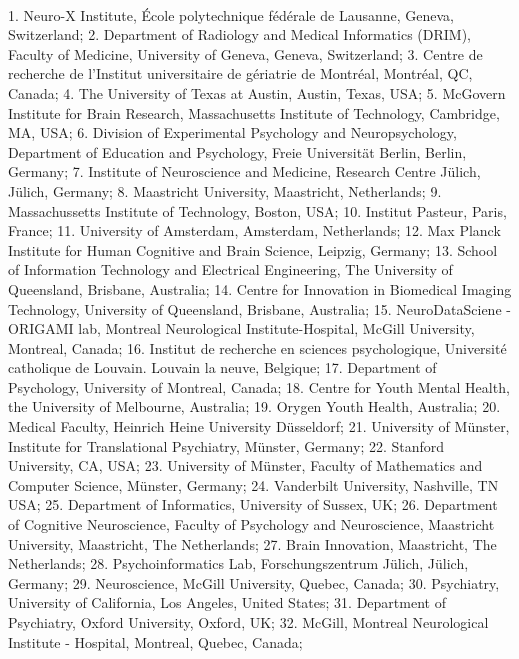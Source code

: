\documentclass[10pt,a4paper,twocolumns]{proc}
\newcommand{\affiliations}[1]{{\scriptsize #1} \\}
\begin{document}
\\
\affiliations{1. Neuro-X Institute, École polytechnique fédérale de Lausanne, Geneva, Switzerland; %
2. Department of Radiology and Medical Informatics (DRIM), Faculty of Medicine, University of Geneva, Geneva, Switzerland; %
3. Centre de recherche de l'Institut universitaire de gériatrie de Montréal, Montréal, QC, Canada; %
4. The University of Texas at Austin, Austin, Texas, USA; %
5. McGovern Institute for Brain Research, Massachusetts Institute of Technology, Cambridge, MA, USA; %
6. Division of Experimental Psychology and Neuropsychology, Department of Education and Psychology, Freie Universität Berlin, Berlin, Germany; %
7. Institute of Neuroscience and Medicine, Research Centre Jülich, Jülich, Germany; %
8. Maastricht University, Maastricht, Netherlands; %
9. Massachussetts Institute of Technology, Boston, USA; %
10. Institut Pasteur, Paris, France; %
11. University of Amsterdam, Amsterdam, Netherlands; %
12. Max Planck Institute for Human Cognitive and Brain Science, Leipzig, Germany; %
13. School of Information Technology and Electrical Engineering, The University of Queensland, Brisbane, Australia; %
14. Centre for Innovation in Biomedical Imaging Technology, University of Queensland, Brisbane, Australia; %
15. NeuroDataSciene - ORIGAMI lab, Montreal Neurological Institute-Hospital, McGill University, Montreal, Canada; %
16. Institut de recherche en sciences psychologique, Université catholique de Louvain. Louvain la neuve, Belgique; %
17. Department of Psychology, University of Montreal, Canada; %
18. Centre for Youth Mental Health, the University of Melbourne, Australia; %
19. Orygen Youth Health, Australia; %
20. Medical Faculty, Heinrich Heine University Düsseldorf; %
21. University of Münster, Institute for Translational Psychiatry, Münster, Germany; %
22. Stanford University, CA, USA; %
23. University of Münster, Faculty of Mathematics and Computer Science, Münster, Germany; %
24. Vanderbilt University, Nashville, TN USA; %
25. Department of Informatics, University of Sussex, UK; %
26. Department of Cognitive Neuroscience, Faculty of Psychology and Neuroscience, Maastricht University, Maastricht, The Netherlands; %
27. Brain Innovation, Maastricht, The Netherlands; %
28. Psychoinformatics Lab, Forschungszentrum J\"ulich, J\"ulich, Germany; %
29. Neuroscience, McGill University, Quebec, Canada; %
30. Psychiatry, University of California, Los Angeles, United States; %
31. Department of Psychiatry, Oxford University, Oxford, UK; %
32. McGill, Montreal Neurological Institute - Hospital, Montreal, Quebec, Canada; %
}
\end{document}
